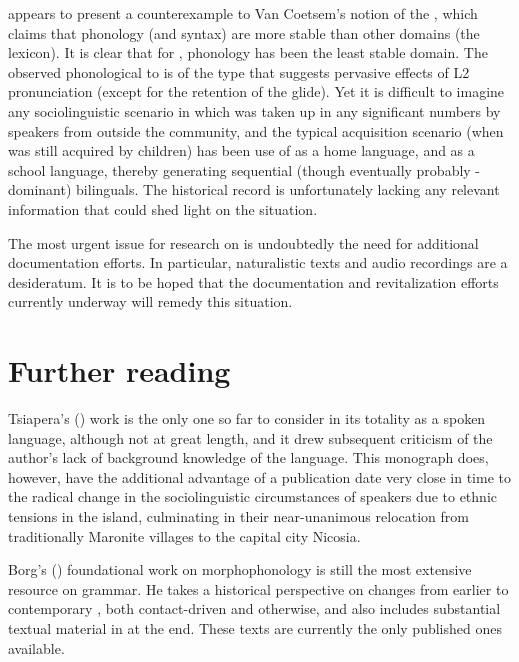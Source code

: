 \documentclass[output=paper]{langsci/langscibook}
\begin{document}
 appears to present a counterexample to Van Coetsem’s notion of the , which claims that phonology (and syntax) are more stable than other domains (the lexicon). It is clear that for , phonology has been the least stable domain. The observed phonological  to  is of the type that suggests pervasive effects of L2 pronunciation (except for the retention of the  glide). Yet it is difficult to imagine any sociolinguistic scenario in which  was taken up in any significant numbers by  speakers from outside the community, and the typical acquisition scenario (when  was still acquired by children) has been use of  as a home language, and  as a school language, thereby generating sequential (though eventually probably -dominant) bilinguals. The historical record is unfortunately lacking any relevant information that could shed light on the situation.

The most urgent issue for  research on  is undoubtedly the need for additional documentation efforts. In particular, naturalistic texts and audio recordings are a desideratum. It is to be hoped that the documentation and revitalization efforts currently underway will remedy this situation.

\section*{Further reading}\label{FR}

Tsiapera's (\citeyear{Tsiapera1969}) work is the only one so far to consider  in its totality as a spoken language, although not at great length, and it drew subsequent criticism of the author’s lack of background knowledge of the  language. This monograph does, however, have the additional advantage of a publication date very close in time to the radical change in the sociolinguistic circumstances of  speakers due to ethnic tensions in the island, culminating in their near-unanimous relocation from traditionally Maronite villages to the capital city Nicosia.

Borg's (\citeyear{Borg1985}) foundational work on morphophonology is still the most extensive resource on  grammar. He takes a historical perspective on changes from earlier  to contemporary , both contact-driven and otherwise, and also includes substantial textual material in  at the end. These texts are currently the only published ones available.
\end{document}
